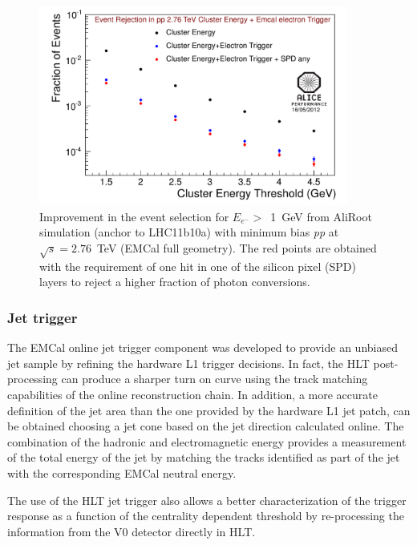 \begin{figure}[ht]
\includegraphics[width=24pc]{figures/Fig7Events_performance.pdf}
\begin{center}
\caption{\label{f10} 
Improvement in the event selection for $E_{e^-}>$~1~GeV from AliRoot simulation (anchor to LHC11b10a) with minimum bias {\it pp} at $\sqrt{s}=2.76$~TeV (EMCal full geometry).
The red points are obtained with the requirement of one hit in one of the silicon pixel (SPD) layers to reject a higher fraction of photon conversions.
}
\end{center}
\end{figure}


\subsubsection{Jet trigger}

The EMCal online jet trigger component was developed to provide 
an unbiased jet sample by refining the hardware L1 trigger decisions.
In fact, the HLT post-processing can produce a sharper turn on curve 
using the track matching capabilities of the online reconstruction chain. 
In addition, a more accurate definition of the jet area than the one provided by the hardware L1 jet patch, 
can be obtained choosing a jet cone based on the jet direction calculated online.
The combination of the hadronic and electromagnetic energy provides a measurement of 
the total energy of the jet by matching the tracks identified as part of the jet with 
the corresponding EMCal neutral energy.

The use of the HLT jet trigger also allows a better characterization 
of the trigger response as a function of the centrality dependent threshold 
by re-processing the information from the V0 detector directly in HLT.


